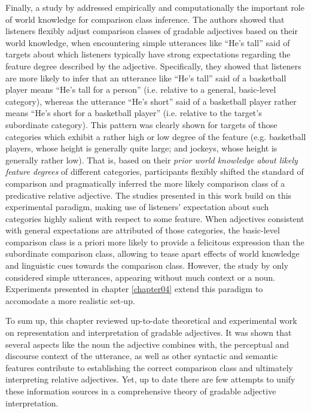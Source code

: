 Finally, a study by \textcite{tessler2017warm} addressed empirically and computationally the important role of world knowledge for comparison class inference. The authors showed that listeners flexibly adjust comparison classes of gradable adjectives based on their world knowledge, when encountering simple utterances like “He’s tall” said of targets about which listeners typically have strong expectations regarding the feature degree described by the adjective. Specifically, they showed that listeners are more likely to infer that an utterance like “He’s tall” said of a basketball player means “He’s tall for a person” (i.e. relative to a general, basic-level category), whereas the utterance “He’s short” said of a basketball player rather means “He’s short for a basketball player” (i.e. relative to the target’s subordinate category). This pattern was clearly shown for targets of those categories which exhibit a rather high or low degree of the feature (e.g. basketball players, whose height is generally quite large; and jockeys, whose height is generally rather low). That is, based on their \emph{prior world knowledge about likely feature degrees} of different categories, participants flexibly shifted the standard of comparison and pragmatically inferred the more likely comparison class of a predicative relative adjective. 
The studies presented in this work build on this experimental paradigm, making use of listeners’ expectation about such categories highly salient with respect to some feature. When adjectives consistent with general expectations are attributed of those categories, the basic-level comparison class is a priori more likely to provide a felicitous expression than the subordinate comparison class, allowing to tease apart effects of world knowledge and linguistic cues towards the comparison class. 
However, the study by \textcite{tessler2017warm} only considered simple utterances, appearing without much context or a noun. Experiments presented in chapter \ref{chapter04} extend this paradigm to accomodate a more realistic set-up. 

To sum up, this chapter reviewed up-to-date theoretical and experimental work on representation and interpretation of gradable adjectives. It was shown that several aspects like the noun the adjective combines with, the perceptual and discourse context of the utterance, as well as other syntactic and semantic features contribute to establishing the correct comparison class and ultimately interpreting relative adjectives. Yet, up to date there are few attempts to unify these information sources in a comprehensive theory of gradable adjective interpretation.  